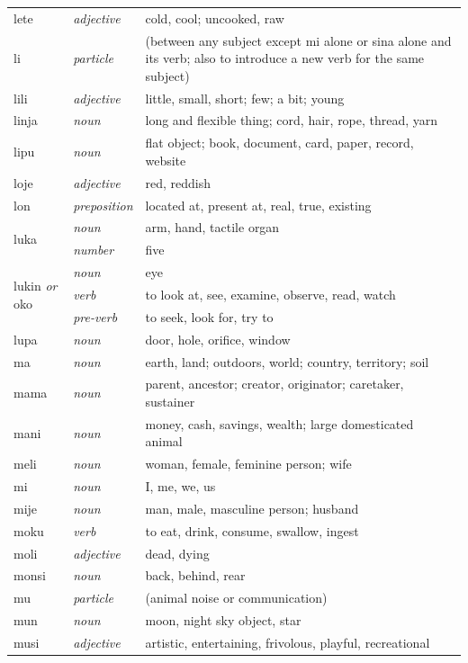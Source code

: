 \documentclass[14pt, a4paper]{extreport}
\begin{document}
\begin{longtable}{llp{10cm}}
  lete & \textit{adjective} & cold, cool; uncooked, raw \\
  li & \textit{particle} & (between any subject except mi alone or sina alone and its verb; also to introduce a new verb for the same subject) \\
  lili & \textit{adjective} & little, small, short; few; a bit; young \\
  linja & \textit{noun} & long and flexible thing; cord, hair, rope, thread, yarn \\
  lipu & \textit{noun} & flat object; book, document, card, paper, record, website \\
  loje & \textit{adjective} & red, reddish \\
  lon & \textit{preposition} & located at, present at, real, true, existing \\
  \multirow[t]{2}{*}{luka} & \textit{noun} & arm, hand, tactile organ \\
  & \textit{number} & five \\
  \multirow[t]{3}{*}{lukin \textit{or} oko} & \textit{noun} & eye \\
  & \textit{verb} & to look at, see, examine, observe, read, watch \\
  & \textit{pre-verb} & to seek, look for, try to \\
  lupa & \textit{noun} & door, hole, orifice, window \\
  ma & \textit{noun} & earth, land; outdoors, world; country, territory; soil \\
  mama & \textit{noun} & parent, ancestor; creator, originator; caretaker, sustainer \\
  mani & \textit{noun} & money, cash, savings, wealth; large domesticated animal \\
  meli & \textit{noun} & woman, female, feminine person; wife \\
  mi & \textit{noun} & I, me, we, us \\
  mije & \textit{noun} & man, male, masculine person; husband \\
  moku & \textit{verb} & to eat, drink, consume, swallow, ingest \\
  moli & \textit{adjective} & dead, dying \\
  monsi & \textit{noun} & back, behind, rear \\
  mu & \textit{particle} & (animal noise or communication) \\
  mun & \textit{noun} & moon, night sky object, star \\
  musi & \textit{adjective} & artistic, entertaining, frivolous, playful, recreational \\

\end{longtable}
\end{document}
